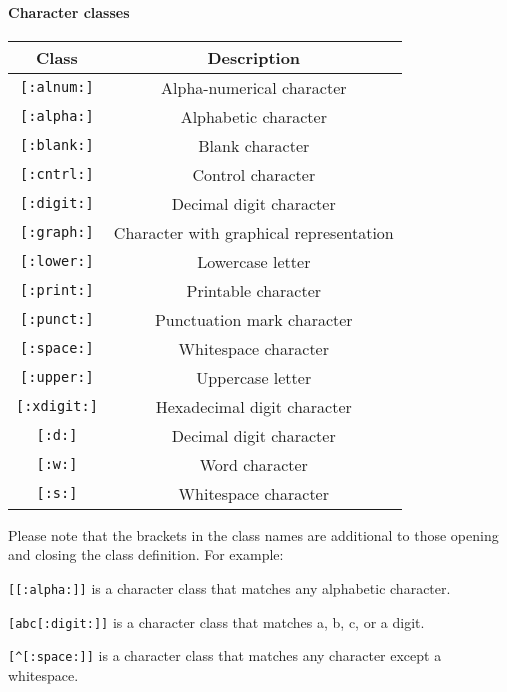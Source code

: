 \paragraph{Character classes}
\begin{center}
	\begin{tabular}{|c|c|}
		\hline
		Class				&	Description							\\
		\hline
		\verb![:alnum:]!	&	Alpha-numerical character			\\
		\hline
		\verb![:alpha:]!	&	Alphabetic character			\\
		\hline
		\verb![:blank:]!	&	Blank character				\\
		\hline
		\verb![:cntrl:]!	&	Control character		\\
		\hline
		\verb![:digit:]!	&	Decimal digit character					\\
		\hline
		\verb![:graph:]!	&	Character with graphical representation\\
		\hline
		\verb![:lower:]!	&	Lowercase letter	\\
		\hline
		\verb![:print:]!	&	Printable character				\\
		\hline
		\verb![:punct:]!	&	Punctuation mark character	\\
		\hline
		\verb![:space:]!	&	Whitespace character	\\
		\hline
		\verb![:upper:]!	&	Uppercase letter	\\
		\hline
		\verb![:xdigit:]!	&	Hexadecimal digit character\\
		\hline
		\verb![:d:]!		&	Decimal digit character	\\
		\hline
		\verb![:w:]!		&	Word character		\\
		\hline
		\verb![:s:]!		&	Whitespace character\\
		\hline
	\end{tabular}
\end{center}
Please note that the brackets in the class names are additional to those opening and closing the class definition. For example:

\verb![[:alpha:]]! is a character class that matches any alphabetic character.

\verb![abc[:digit:]]! is a character class that matches a, b, c, or a digit.

\verb![^[:space:]]! is a character class that matches any character except a whitespace.

